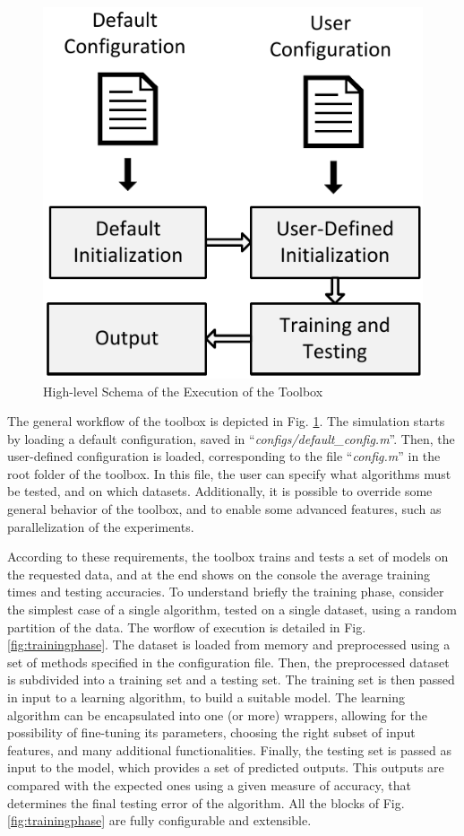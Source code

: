 \begin{figure}
\centering
\includegraphics[scale=0.6]{./images/Workflow}
\caption{High-level Schema of the Execution of the Toolbox}
\label{fig:workflow}
\end{figure}

The general workflow of the toolbox is depicted in Fig. \ref{fig:workflow}. The simulation starts by loading a default configuration, saved in ``\textit{configs/default\_config.m}''. Then, the user-defined configuration is loaded, corresponding to the file ``\textit{config.m}'' in the root folder of the toolbox. In this file, the user can specify what algorithms must be tested, and on which datasets. Additionally, it is possible to override some general behavior of the toolbox, and to enable some advanced features, such as parallelization of the experiments.

According to these requirements, the toolbox trains and tests a set of models on the requested data, and at the end shows on the console the average training times and testing accuracies. To understand briefly the training phase, consider the simplest case of a single algorithm, tested on a single dataset, using a random partition of the data. The worflow of execution is detailed in Fig. \ref{fig:trainingphase}. The dataset is loaded from memory and preprocessed using a set of methods specified in the configuration file. Then, the preprocessed dataset is subdivided into a training set and a testing set. The training set is then passed in input to a learning algorithm, to build a suitable model. The learning algorithm can be encapsulated into one (or more) wrappers, allowing for the possibility of fine-tuning its parameters, choosing the right subset of input features, and many additional functionalities. Finally, the testing set is passed as input to the model, which provides a set of predicted outputs. This outputs are compared with the expected ones using a given measure of accuracy, that determines the final testing error of the algorithm. All the blocks of Fig. \ref{fig:trainingphase} are fully configurable and extensible.

